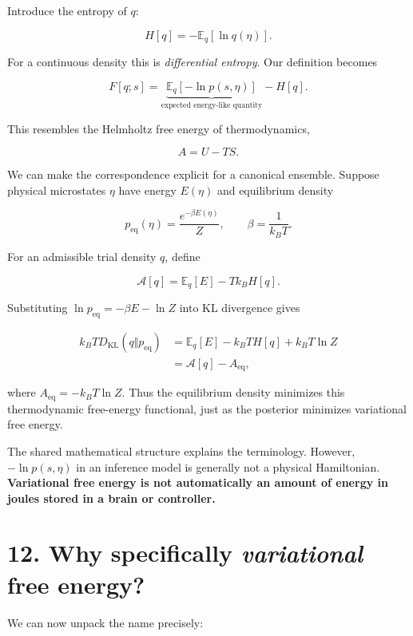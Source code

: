 \documentclass[
  letterpaper,
  DIV=11,
  numbers=noendperiod]{scrreprt}
\begin{document}
Introduce the entropy of \(q\):

\[
H[q]=-\mathbb E_q[\ln q(\eta)].
\]

For a continuous density this is \emph{differential entropy}. Our
definition becomes

\[
F[q;s]=\underbrace{\mathbb E_q[-\ln p(s,\eta)]}_{\text{expected energy-like quantity}}-H[q].
\]

This resembles the Helmholtz free energy of thermodynamics,

\[
A=U-TS.
\]

We can make the correspondence explicit for a canonical ensemble.
Suppose physical microstates \(\eta\) have energy \(E(\eta)\) and
equilibrium density

\[
p_{\mathrm{eq}}(\eta)=\frac{e^{-\beta E(\eta)}}{Z},
\qquad\beta=\frac{1}{k_B T}.
\]

For an admissible trial density \(q\), define

\[
\mathcal A[q]=\mathbb E_q[E]-T k_B H[q].
\]

Substituting \(\ln p_{\mathrm{eq}}=-\beta E-\ln Z\) into KL divergence
gives

\[
\begin{aligned}
k_B T D_{\mathrm{KL}}(q\Vert p_{\mathrm{eq}})
&=\mathbb E_q[E]-k_B T H[q]+k_B T\ln Z\\
&=\mathcal A[q]-A_{\mathrm{eq}},
\end{aligned}
\]

where \(A_{\mathrm{eq}}=-k_B T\ln Z\). Thus the equilibrium density
minimizes this thermodynamic free-energy functional, just as the
posterior minimizes variational free energy.

The shared mathematical structure explains the terminology. However,
\(-\ln p(s,\eta)\) in an inference model is generally not a physical
Hamiltonian. \textbf{Variational free energy is not automatically an
amount of energy in joules stored in a brain or controller.}

\section{\texorpdfstring{12. Why specifically \emph{variational} free
energy?}{12. Why specifically variational free energy?}}\label{why-specifically-variational-free-energy}

We can now unpack the name precisely:
\end{document}
